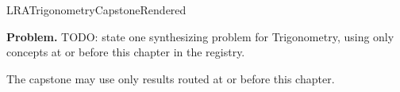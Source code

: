 \ifcsname LRATrigonometryCapstoneRendered\endcsname
\else
\expandafter\gdef\csname LRATrigonometryCapstoneRendered\endcsname{}

\newpage
{}
\label{cap:trigonometry}

\begin{tcolorbox}[
  colback=gray!6,
  colframe=gray!40,
  arc=2pt,
  left=8pt, right=8pt, top=6pt, bottom=6pt,
  title={\small\textbf{Capstone Problem}},
  fonttitle=\small\bfseries
]
\textbf{Problem.}
TODO: state one synthesizing problem for Trigonometry, using only concepts at or
before this chapter in the registry.
\end{tcolorbox}

\begin{remark*}
The capstone may use only results routed at or before this chapter.
\end{remark*}

\clearpage
\fi
